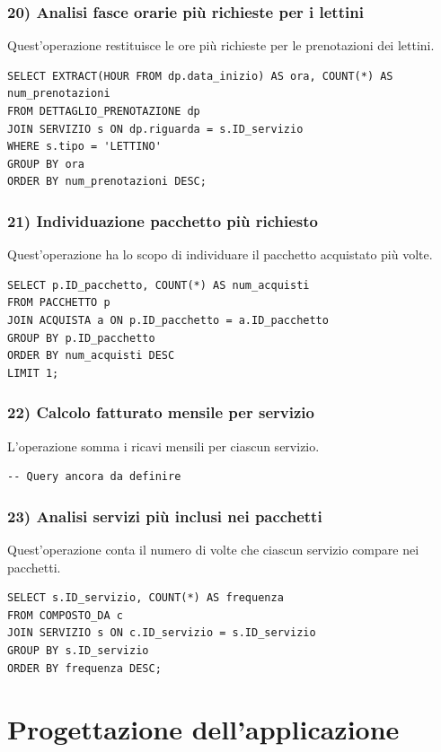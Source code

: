 \documentclass[a4paper,12pt]{report}
\begin{document}
\subsection*{20) Analisi fasce orarie più richieste per i lettini}
Quest'operazione restituisce le ore più richieste per le prenotazioni dei lettini.
\begin{verbatim}
SELECT EXTRACT(HOUR FROM dp.data_inizio) AS ora, COUNT(*) AS num_prenotazioni
FROM DETTAGLIO_PRENOTAZIONE dp
JOIN SERVIZIO s ON dp.riguarda = s.ID_servizio
WHERE s.tipo = 'LETTINO'
GROUP BY ora
ORDER BY num_prenotazioni DESC;
\end{verbatim}

\subsection*{21) Individuazione pacchetto più richiesto}
Quest'operazione ha lo scopo di individuare il pacchetto acquistato più volte.
\begin{verbatim}
SELECT p.ID_pacchetto, COUNT(*) AS num_acquisti
FROM PACCHETTO p
JOIN ACQUISTA a ON p.ID_pacchetto = a.ID_pacchetto
GROUP BY p.ID_pacchetto
ORDER BY num_acquisti DESC
LIMIT 1;
\end{verbatim}

\subsection*{22) Calcolo fatturato mensile per servizio}
L'operazione somma i ricavi mensili per ciascun servizio.

\begin{verbatim}
-- Query ancora da definire
\end{verbatim}

\subsection*{23) Analisi servizi più inclusi nei pacchetti}
Quest'operazione conta il numero di volte che ciascun servizio compare nei pacchetti.
\begin{verbatim}
SELECT s.ID_servizio, COUNT(*) AS frequenza
FROM COMPOSTO_DA c
JOIN SERVIZIO s ON c.ID_servizio = s.ID_servizio
GROUP BY s.ID_servizio
ORDER BY frequenza DESC;
\end{verbatim}


\chapter{Progettazione dell'applicazione}
\end{document}
